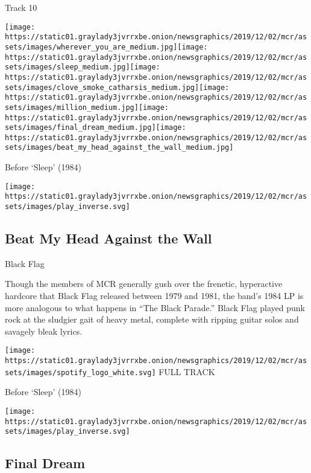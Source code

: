 Track 10

\texttt{[image: https://static01.graylady3jvrrxbe.onion/newsgraphics/2019/12/02/mcr/assets/images/wherever\_you\_are\_medium.jpg]}\texttt{[image: https://static01.graylady3jvrrxbe.onion/newsgraphics/2019/12/02/mcr/assets/images/sleep\_medium.jpg]}\texttt{[image: https://static01.graylady3jvrrxbe.onion/newsgraphics/2019/12/02/mcr/assets/images/clove\_smoke\_catharsis\_medium.jpg]}\texttt{[image: https://static01.graylady3jvrrxbe.onion/newsgraphics/2019/12/02/mcr/assets/images/million\_medium.jpg]}\texttt{[image: https://static01.graylady3jvrrxbe.onion/newsgraphics/2019/12/02/mcr/assets/images/final\_dream\_medium.jpg]}\texttt{[image: https://static01.graylady3jvrrxbe.onion/newsgraphics/2019/12/02/mcr/assets/images/beat\_my\_head\_against\_the\_wall\_medium.jpg]}

Before `Sleep' (1984)

\texttt{[image: https://static01.graylady3jvrrxbe.onion/newsgraphics/2019/12/02/mcr/assets/images/play\_inverse.svg]}

\hypertarget{beat-my-head-against-the-wall}{%
\subsection{Beat My Head Against the
Wall}\label{beat-my-head-against-the-wall}}

Black Flag

Though the members of MCR generally gush over the frenetic, hyperactive
hardcore that Black Flag released between 1979 and 1981, the band's 1984
LP is more analogous to what happens in ``The Black Parade.'' Black Flag
played punk rock at the sludgier gait of heavy metal, complete with
ripping guitar solos and savagely bleak lyrics.

\href{https://open.spotify.com/track/0dNS1arDASqkkgGlrkCezo?si=X81iX7C9SSGo-tIEQ0VZKw}{}

\texttt{[image: https://static01.graylady3jvrrxbe.onion/newsgraphics/2019/12/02/mcr/assets/images/spotify\_logo\_white.svg]}
FULL TRACK

Before `Sleep' (1984)

\texttt{[image: https://static01.graylady3jvrrxbe.onion/newsgraphics/2019/12/02/mcr/assets/images/play\_inverse.svg]}

\hypertarget{final-dream}{%
\subsection{Final Dream}\label{final-dream}}

